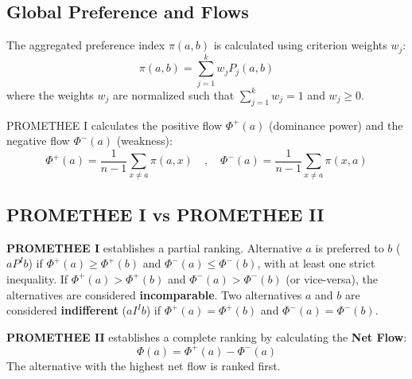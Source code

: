 \documentclass[12pt,a4paper,oneside]{report}
\begin{document}
\subsection{Global Preference and Flows}
The aggregated preference index $\pi(a,b)$ is calculated using criterion weights $w_j$:
\begin{equation}
    \pi(a, b) = \sum_{j=1}^{k} w_j P_j(a, b)
\end{equation}
where the weights $w_j$ are normalized such that $\sum_{j=1}^{k} w_j = 1$ and $w_j \geq 0$.

PROMETHEE I calculates the positive flow $\Phi^+(a)$ (dominance power) and the negative flow $\Phi^-(a)$ (weakness):
\begin{equation}
    \Phi^+(a) = \frac{1}{n-1} \sum_{x \neq a} \pi(a, x) \quad , \quad \Phi^-(a) = \frac{1}{n-1} \sum_{x \neq a} \pi(x, a)
\end{equation}

\subsection{PROMETHEE I vs PROMETHEE II}
\textbf{PROMETHEE I} establishes a partial ranking. Alternative $a$ is preferred to $b$ ($a P^I b$) if $\Phi^+(a) \ge \Phi^+(b)$ and $\Phi^-(a) \le \Phi^-(b)$, with at least one strict inequality. If $\Phi^+(a) > \Phi^+(b)$ and $\Phi^-(a) > \Phi^-(b)$ (or vice-versa), the alternatives are considered \textbf{incomparable}. Two alternatives $a$ and $b$ are considered \textbf{indifferent} ($a I^I b$) if $\Phi^+(a) = \Phi^+(b)$ and $\Phi^-(a) = \Phi^-(b)$.

\textbf{PROMETHEE II} establishes a complete ranking by calculating the \textbf{Net Flow}:
\begin{equation}
    \Phi(a) = \Phi^+(a) - \Phi^-(a)
\end{equation}
The alternative with the highest net flow is ranked first.
\end{document}
